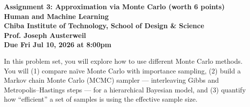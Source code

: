 \documentclass[11pt]{article}
\begin{document}
\begin{centering}
{\large \bf Assignment 3: Approximation via Monte Carlo (worth 6 points) \\ Human and Machine Learning \\ Chiba Institute of Technology, School of Design \& Science \\ Prof. Joseph Austerweil \\ Due Fri Jul 10, 2026 at 8:00pm\\}
\end{centering}
In this problem set, you will explore how to use different Monte Carlo methods. You will (1) compare na\"{i}ve Monte Carlo with importance sampling, (2) build a Markov chain Monte Carlo (MCMC) sampler --- interleaving Gibbs and Metropolis--Hastings steps --- for a hierarchical Bayesian model, and (3) quantify how ``efficient'' a set of samples is using the effective sample size.
\end{document}
